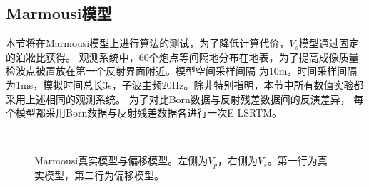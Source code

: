 \subsection{Marmousi模型}
本节将在Marmousi模型上进行算法的测试，为了降低计算代价，$V_s$模型通过固定的泊凇比获得。
观测系统中，60个炮点等间隔地分布在地表，为了提高成像质量检波点被置放在第一个反射界面附近。模型空间采样间隔
为10m，时间采样间隔为1ms，模拟时间总长3s，子波主频20Hz。除非特别指明，本节中所有数值实验都采用上述相同的观测系统。
为了对比Born数据与反射残差数据间的反演差异，
每个模型都采用Born数据与反射残差数据各进行一次E-LSRTM。
\begin{figure}[!htb]
   \centering
   \\
   \caption{Marmousi真实模型与偏移模型。左侧为$V_p$，右侧为$V_s$。第一行为真实模型，第二行为偏移模型。}
   \label{fig:TrueAndInitial_1}
\end{figure}
